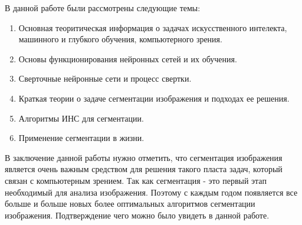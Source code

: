 \documentclass[bachelor, och, coursework]{shiza}
\begin{document}
\newpage
\conclusion %

В данной работе были рассмотрены следующие темы:

\begin{enumerate}
    \item Основная теоритическая информация о задачах искусственного интелекта, машинного и глубкого обучения, компьютерного зрения.
    \item Основы функционирования нейронных сетей и их обучения.
    \item Сверточные нейронные сети и процесс свертки.
    \item Краткая теории о задаче сегментации изображения и подходах ее решения.
    \item Алгоритмы ИНС для сегментации.
    \item Применение сегментации в жизни.
\end{enumerate}

В заключение данной работы нужно отметить, что сегментация изображения является очень важным средством для решения такого пласта задач, который связан с 
компьютерным зрением. Так как сегментация - это первый этап необходимый для анализа изображения. Поэтому с каждым годом появляется все больше и больше 
новых более оптимальных алгоритмов сегментации изображения. Подтверждение чего можно было увидеть в данной работе.
\end{document}
